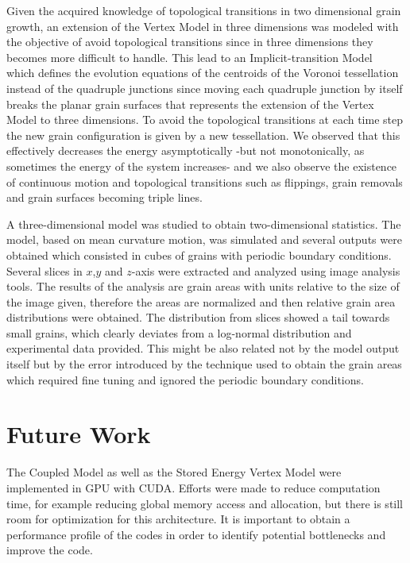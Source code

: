 Given the acquired knowledge of topological transitions in two dimensional grain growth, an extension of the Vertex Model in three dimensions was modeled with the objective of avoid topological transitions since in three dimensions they becomes more difficult to handle. 
This lead to an Implicit-transition Model~\cite{sazo2017implicit} which defines the evolution equations of the centroids of the Voronoi tessellation instead of the quadruple junctions since moving each quadruple junction by itself breaks the planar grain surfaces that represents the extension of the Vertex Model to three dimensions.
To avoid the topological transitions at each time step the new grain configuration is given by a new tessellation. 
We observed that this effectively decreases the energy asymptotically -but not monotonically, as sometimes the energy of the system increases- and we also observe the existence of continuous motion and topological transitions such as flippings, grain removals and grain surfaces becoming triple lines.

A three-dimensional model was studied to obtain two-dimensional statistics. 
The model, based on mean curvature motion, was simulated and several outputs were obtained which consisted in cubes of grains with periodic boundary conditions. 
Several slices in $x$,$y$ and $z$-axis were extracted and analyzed using image analysis tools.
The results of the analysis are grain areas with units relative to the size of the image given, therefore the areas are normalized and then relative grain area distributions were obtained. 
The distribution from slices showed a tail towards small grains, which clearly deviates from a log-normal distribution and experimental data provided. 
This might be also related not by the model output itself but by the error introduced by the technique used to obtain the grain areas which required fine tuning and ignored the periodic boundary conditions.

\section{Future Work}

The Coupled Model as well as the Stored Energy Vertex Model were implemented in GPU with CUDA. Efforts were made to reduce computation time, 
for example reducing global memory access and allocation, but there is still room for optimization for this architecture. 
It is important to obtain a performance profile of the codes in order to identify potential bottlenecks and improve the code.

